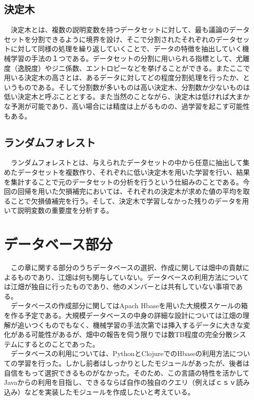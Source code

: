 \documentclass{scrartcl}
\begin{document}
\subsection{決定木}
\label{sec:orgda66a07}
　決定木とは、複数の説明変数を持つデータセットに対して、最も議論のデータセットを分割できるように境界を設け、そこで分割されたそれぞれのデータセットに対して同様の処理を繰り返していくことで、データの特徴を抽出していく機械学習の手法の１つである。データセットの分割に用いられる指標として、尤離度（逸脱度）やジニ係数、エントロピーなどを挙げることができる。またここで用いる決定木の高さとは、あるデータに対してどの程度分割処理を行ったか、というものである。そして分割数が多いものは高い決定木、分割数か少ないものは低い決定木と呼ぶこととする。また当然のことながら、決定木は低ければ大まかな予測が可能であり、高い場合には精度は上がるものの、過学習を起こす可能性もある。\\
\subsection{ランダムフォレスト}
\label{sec:orgee1b924}
　ランダムフォレストとは、与えられたデータセットの中から任意に抽出して集めたデータセットを複数作り、それぞれに低い決定木を用いた学習を行い、結果を集計することで元のデータセットの分析を行うという仕組みのことである。今回の回帰を用いた欠損補完においては、それぞれの決定木が求めた値の平均を取ることで欠損値補完を行う。そして、決定木で学習しなかった残りのデータを用いて説明変数の重要度を分析する。\\

\section{データベース部分}
\label{sec:org23c54de}
　この章に関する部分のうちデータベースの選択、作成に関しては畑中の貢献によるものであり、江畑は何も関与していない。データベースの利用方法については江畑が独自に行ったものであり、他のメンバーとは共有していない事項である。\\
　データベースの作成部分に関してはApach Hbaseを用いた大規模スケールの箱を作る予定である。大規模データベースの中身の詳細な設計については江畑の理解が追いつくものでもなく、機械学習の手法次第では挿入するデータに大きな変化がある可能性があるが、畑中の報告を伺う限りでは数TB程度の完全分散システムにするとのことであった。\\
　データベースの利用については、PythonとClojureでのHbaseの利用方法についての学習を行った。しかし前者はしっかりとしたモジュールがあったが、後者は自信をもって選択できるものがなかった。そのため、この言語の特性を活かしてJavaからの利用を目指し、できるならば自作の独自のクエリ（例えばｃｓｖ読み込み）などを実装したモジュールを作成したいと考えている。\\
\end{document}

